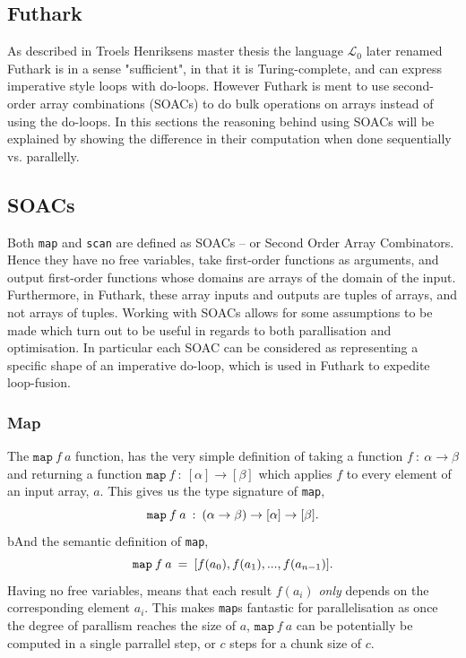 \documentclass[11pt]{article}
\begin{document}
\subsection{Futhark}
As described in Troels Henriksens master thesis \cite[The $\mathcal{L}_0$ language, p. 8]{MasterTroels} the language $\mathcal{L}_0$ later renamed Futhark is in a sense "sufficient", in that it is Turing-complete, and can express imperative style loops with do-loops. However Futhark is ment to use second-order array combinations (SOACs) to do bulk operations on arrays instead of using the do-loops. In this sections the reasoning behind using SOACs will be explained by showing the difference in their computation when done sequentially vs. parallelly.
\subsection{SOACs}
Both \texttt{map} and \texttt{scan} are defined as SOACs -- or Second Order Array Combinators. Hence they have no free variables, take first-order functions as arguments, and output first-order
 functions whose domains are arrays of the domain of the input. Furthermore, in Futhark, these array inputs and outputs are tuples of arrays, and not arrays of tuples. Working with SOACs allows for some assumptions to be made which turn out to be useful in regards to both parallisation and optimisation. In particular each SOAC can be considered as representing a specific shape of an imperative do-loop, which
 is used in Futhark to expedite loop-fusion. \cite[chap. 7]{MasterTroels}

\subsubsection{Map}
The $\texttt{map} \: f \: a$ function, has the very simple definition of taking a function $f \: : \: \alpha \to \beta$ and returning a function $\mathtt{map} \:f \: : \: [\alpha] \to [\beta]$  which
 applies $f$ to every element of an input array, $a$.  This gives us the type signature of \texttt{map},
$$\mathtt{map} \: f \: a \: :  \: (\alpha \to \beta) \to [\alpha] \to [\beta]\mathnormal{.}$$
bAnd the semantic definition of \texttt{map},
$$\mathtt{map} \: f \: a \: =  \: [f(a_0), f(a_1), ..., f(a_{n-1})]\mathnormal{.}$$
Having no free variables, means that each result $f(a_i)$ \textit{only} depends on the corresponding element $a_i$. This makes \texttt{map}s fantastic for parallelisation as once the
 degree of parallism reaches the size of $a$, $\mathtt{map} \: f \: a$ can be potentially be computed in a single parrallel step, or $c$ steps for a chunk size of $c$.
\end{document}
